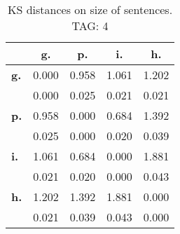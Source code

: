 \begin{table}[h!]
\begin{center}
\begin{tabular}{| l || c | c | c | c |}\hline
 & {\bf g.} & {\bf p.} & {\bf i.} & {\bf h.} \\\hline\hline
{\bf g.} & 0.000 & 0.958 & 1.061 & 1.202 \\
{\bf } & 0.000 & 0.025 & 0.021 & 0.021 \\\hline
{\bf p.} & 0.958 & 0.000 & 0.684 & 1.392 \\
{\bf } & 0.025 & 0.000 & 0.020 & 0.039 \\\hline
{\bf i.} & 1.061 & 0.684 & 0.000 & 1.881 \\
{\bf } & 0.021 & 0.020 & 0.000 & 0.043 \\\hline
{\bf h.} & 1.202 & 1.392 & 1.881 & 0.000 \\
{\bf } & 0.021 & 0.039 & 0.043 & 0.000 \\\hline
\end{tabular}
\caption{KS distances on size of sentences. TAG: 4}
\end{center}
\end{table}